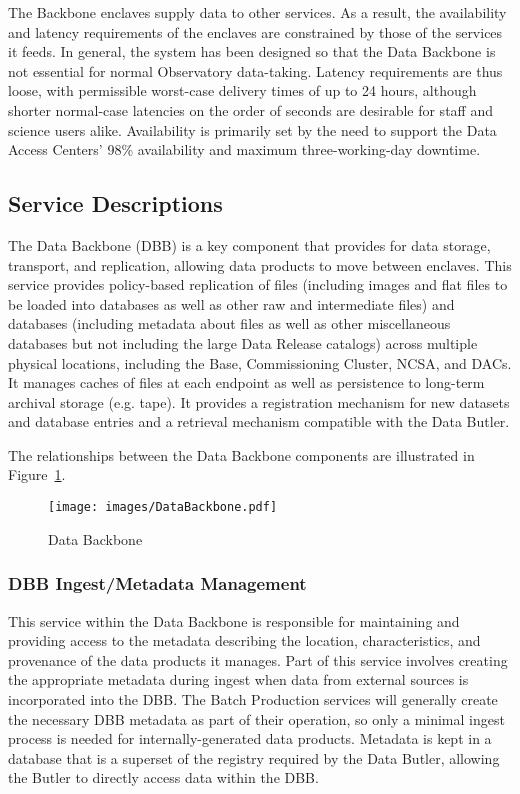 \documentclass[DM,toc]{lsstdoc}
\begin{document}
The Backbone enclaves supply data to other services.
As a result, the availability and latency requirements of the enclaves are constrained by those of the services it feeds.
In general, the system has been designed so that the Data Backbone is not essential for normal Observatory data-taking.
Latency requirements are thus loose, with permissible worst-case delivery times of up to 24 hours, although shorter normal-case latencies on the order of seconds are desirable for staff and science users alike.
Availability is primarily set by the need to support the Data Access Centers' 98\% availability and maximum three-working-day downtime.

\subsection{Service Descriptions}\label{backbone-service-descriptions}

The Data Backbone (DBB) is a key component that provides for data storage, transport, and replication, allowing data products to move between enclaves.
This service provides policy-based replication of files (including images and flat files to be loaded into databases as well as other raw and intermediate files) and databases (including metadata about files as well as other miscellaneous databases but not including the large Data Release catalogs) across multiple physical locations, including the Base, Commissioning Cluster, NCSA, and DACs.
It manages caches of files at each endpoint as well as persistence to long-term archival storage (e.g. tape).
It provides a registration mechanism for new datasets and database entries and a retrieval mechanism compatible with the Data Butler.

The relationships between the Data Backbone components are illustrated
in Figure~\ref{fig:dbb}.

\begin{figure}
\centering
\texttt{[image: images/DataBackbone.pdf]}
\caption{Data Backbone}
\label{fig:dbb}
\end{figure}

\subsubsection{DBB Ingest/Metadata Management}\label{dbb-ingest-metadata}

This service within the Data Backbone is responsible for maintaining and providing access to the metadata describing the location, characteristics, and provenance of the data products it manages.
Part of this service involves creating the appropriate metadata during ingest when data from external sources is incorporated into the DBB.
The Batch Production services will generally create the necessary DBB metadata as part of their operation, so only a minimal ingest process is needed for internally-generated data products.
Metadata is kept in a database that is a superset of the registry required by the Data Butler, allowing the Butler to directly access data within the DBB.
\end{document}
